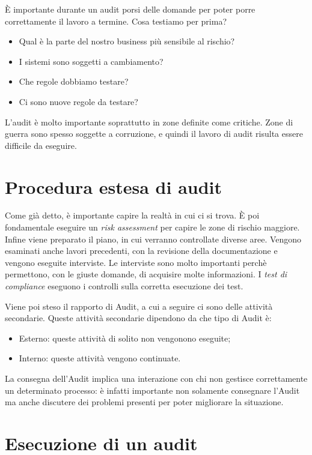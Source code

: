 È importante durante un audit porsi delle domande per poter porre correttamente 
il lavoro a termine.
Cosa testiamo per prima?
\begin{itemize}
\item Qual è la parte del nostro business più sensibile al rischio?
\item I sistemi sono soggetti a cambiamento?
\item Che regole dobbiamo testare?
\item Ci sono nuove regole da testare?
\end{itemize}

L'audit è molto importante soprattutto in zone definite come critiche. Zone di 
guerra sono spesso soggette a corruzione, e quindi il lavoro di audit risulta 
essere difficile da eseguire.

\section{Procedura estesa di audit}

Come già detto, è importante capire la realtà in cui ci si trova. È poi 
fondamentale eseguire un \textit{risk assessment} per capire le zone di rischio 
maggiore.
Infine viene preparato il piano, in cui verranno controllate diverse aree. 
Vengono esaminati anche lavori precedenti, con la revisione della 
documentazione 
e vengono eseguite interviste. Le interviste sono molto importanti perchè 
permettono, con le giuste domande, di acquisire molte informazioni.
I \textit{test di compliance} eseguono i controlli sulla corretta esecuzione 
dei 
test.

Viene poi steso il rapporto di Audit, a cui a seguire ci sono delle attività 
secondarie. Queste attività secondarie dipendono da che tipo di Audit è:
\begin{itemize}
\item Esterno: queste attività di solito non vengonono eseguite;
\item Interno: queste attività vengono continuate.
\end{itemize}

La consegna dell'Audit implica una interazione con chi non gestisce 
correttamente un determinato processo: è infatti importante non solamente 
consegnare l'Audit ma anche discutere dei problemi presenti per poter 
migliorare 
la situazione.

\section{Esecuzione di un audit}

